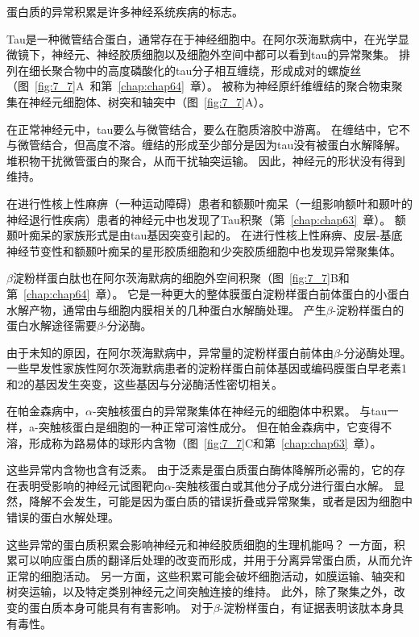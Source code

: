 \begin{proposition}[神经解剖学导航术语] \label{box:7_1}
	
	\quad \quad 蛋白质的异常积累是许多神经系统疾病的标志。
	
	\quad \quad Tau是一种微管结合蛋白，通常存在于神经细胞中。在阿尔茨海默病中，在光学显微镜下，神经元、神经胶质细胞以及细胞外空间中都可以看到tau的异常聚集。
	排列在细长聚合物中的高度磷酸化的tau分子相互缠绕，形成成对的螺旋丝（图~\ref{fig:7_7}A~和第~\ref{chap:chap64}~章）。
	被称为神经原纤维缠结的聚合物束聚集在神经元细胞体、树突和轴突中（图~\ref{fig:7_7}A）。
	
	\quad \quad 在正常神经元中，tau要么与微管结合，要么在胞质溶胶中游离。
	在缠结中，它不与微管结合，但高度不溶。缠结的形成至少部分是因为tau没有被蛋白水解降解。
	堆积物干扰微管蛋白的聚合，从而干扰轴突运输。
	因此，神经元的形状没有得到维持。
	
	\quad \quad 在进行性核上性麻痹（一种运动障碍）患者和额颞叶痴呆（一组影响额叶和颞叶的神经退行性疾病）患者的神经元中也发现了Tau积聚（第~\ref{chap:chap63}~章）。
	额颞叶痴呆的家族形式是由tau基因突变引起的。
	在进行性核上性麻痹、皮层-基底神经节变性和额颞叶痴呆的星形胶质细胞和少突胶质细胞中也发现异常聚集体。
	
	\quad \quad $\beta$淀粉样蛋白肽也在阿尔茨海默病的细胞外空间积聚（图~\ref{fig:7_7}B和第~\ref{chap:chap64}~章）。
	它是一种更大的整体膜蛋白淀粉样蛋白前体蛋白的小蛋白水解产物，通常由与细胞内膜相关的几种蛋白水解酶处理。
	产生$\beta$-淀粉样蛋白的蛋白水解途径需要$\beta$-分泌酶。
	
	\quad \quad 由于未知的原因，在阿尔茨海默病中，异常量的淀粉样蛋白前体由$\beta$-分泌酶处理。
	一些早发性家族性阿尔茨海默病患者的淀粉样蛋白前体基因或编码膜蛋白早老素1和2的基因发生突变，这些基因与分泌酶活性密切相关。
	
	\quad \quad 在帕金森病中，$\alpha$-突触核蛋白的异常聚集体在神经元的细胞体中积累。
	与tau一样，a-突触核蛋白是细胞的一种正常可溶性成分。
	但在帕金森病中，它变得不溶，形成称为路易体的球形内含物（图~\ref{fig:7_7}C和第~\ref{chap:chap63}~章）。
	
	\quad \quad 这些异常内含物也含有泛素。
	由于泛素是蛋白质蛋白酶体降解所必需的，它的存在表明受影响的神经元试图靶向$\alpha$-突触核蛋白或其他分子成分进行蛋白水解。
	显然，降解不会发生，可能是因为蛋白质的错误折叠或异常聚集，或者是因为细胞中错误的蛋白水解处理。
	
	\quad \quad 这些异常的蛋白质积累会影响神经元和神经胶质细胞的生理机能吗？
	一方面，积累可以响应蛋白质的翻译后处理的改变而形成，并用于分离异常蛋白质，从而允许正常的细胞活动。
	另一方面，这些积累可能会破坏细胞活动，如膜运输、轴突和树突运输，以及特定类别神经元之间突触连接的维持。
	此外，除了聚集之外，改变的蛋白质本身可能具有有害影响。
	对于$\beta$-淀粉样蛋白，有证据表明该肽本身具有毒性。
	
\end{proposition}


